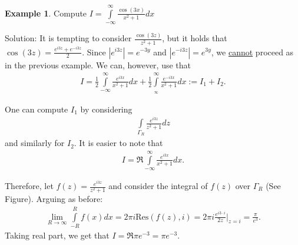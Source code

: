 \documentclass[12pt, a4paper]{article}
\theoremstyle{plain}
\theoremstyle{definition}
\newtheorem{example}{Example} %
\begin{document}
			\begin{example}
				Compute $\displaystyle I=\int\limits_{-\infty}^{\infty}\frac{\cos(3x)}{x^2+1}dx$

				Solution: It is tempting to consider $\frac{\cos(3z)}{z^2+1}$, but it holds that $\cos(3z)=\frac{e^{i3z}+e^{-i3z}}{2}$. Since $|e^{i3z}|=e^{-3y}$ and $|e^{-i3z}| = e^{3y}$, we \underline{cannot} proceed as in the previous example. We can, however, use that
				\begin{align*}
					I= 
					\frac{1}{2}\int\limits_{-\infty}^{\infty}\frac{e^{i3x}}{x^2+1}dx+ 
					\frac{1}{2}\int\limits_{_\infty}^{\infty}\frac{e^{-i3x}}{x^2+1}dx:= 
					I_1+I_2.
				\end{align*}
				\begin{multicols}{2}
					One can compute $I_1$ by considering
					\begin{align*}
						\int\limits_{\Gamma_R}\frac{e^{i3z}}{z^2+1}dz
					\end{align*}
					and similarly for $I_2$. It is easier to note that 
					\begin{align*}
						I = \Re \int\limits_{-\infty}^{\infty}\frac{e^{i3x}}{x^2+1}dx.
					\end{align*}
					\begin{figure}[H]
					\centering
					\end{figure}
				\end{multicols}
				Therefore, let $f(z) = \frac{e^{i3z}}{z^2+1}$ and consider the integral of $f(z)$ over $\Gamma_R$ (See Figure). Arguing as before:
				\begin{align*}
					\lim\limits_{R\to\infty}\int\limits_{-R}^{R}f(x)dx = 
					2\pi i \mathrm{Res}(f(z),i) =
					2\pi i \frac{e^{i3\cdot i}}{2z}\Bigg|_{z=i} =
					\frac{\pi}{e^3}.
				\end{align*}
				Taking real part, we get that $I = \Re \pi e^{-3} = \pi e^{-3}$.\\
			\end{example}
\end{document}
